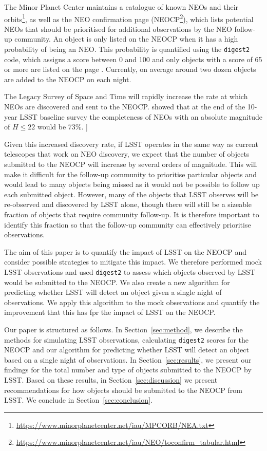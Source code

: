 \documentclass[twocolumn]{aastex631}
\newcommand{\todo}[1]{{\color{red}{[TODO: #1}]}}
\newcommand{\dig}{\texttt{digest2}}
\begin{document}
The Minor Planet Center maintains a catalogue of known NEOs and their orbits\footnote{\url{https://www.minorplanetcenter.net/iau/MPCORB/NEA.txt}}, as well as the NEO confirmation page (NEOCP\footnote{\url{https://www.minorplanetcenter.net/iau/NEO/toconfirm_tabular.html}}), which lists potential NEOs that should be prioritised for additional observations by the NEO follow-up community. An object is only listed on the NEOCP when it has a high probability of being an NEO. This probability is quantified using the \dig{} code, which assigns a score between 0 and 100 and only objects with a score of 65 or more are listed on the page \citep{Keys+2019}. Currently, on average around two dozen objects are added to the NEOCP on each night.

The Legacy Survey of Space and Time \citep[LSST][]{Ivezic+2019} will rapidly increase the rate at which NEOs are discovered and sent to the NEOCP. \citet{Jones+2018} showed that at the end of the 10-year LSST baseline survey the completeness of NEOs with an absolute magnitude of $H \le 22$ would be 73\%. \todo{probably need more details here, e.g.\ how many NEOs discovered in only a year, like in Mario's scary AAS presentations}

Given this increased discovery rate, if LSST operates in the same way as current telescopes that work on NEO discovery, we expect that the number of objects submitted to the NEOCP will increase by several orders of magnitude. This will make it difficult for the follow-up community to prioritise particular objects and would lead to many objects being missed as it would not be possible to follow up each submitted object. However, many of the objects that LSST observes will be re-observed and discovered by LSST alone, though there will still be a sizeable fraction of objects that require community follow-up. It is therefore important to identify this fraction so that the follow-up community can effectively prioritise observations.

The aim of this paper is to quantify the impact of LSST on the NEOCP and consider possible strategies to mitigate this impact. We therefore performed mock LSST observations and used \dig{} to assess which objects observed by LSST would be submitted to the NEOCP. We also create a new algorithm for predicting whether LSST will detect an object given a single night of observations. We apply this algorithm to the mock observations and quantify the improvement that this has fpr the impact of LSST on the NEOCP.

Our paper is structured as follows. In Section~\ref{sec:method}, we describe the methods for simulating LSST observations, calculating \dig{} scores for the NEOCP and our algorithm for predicting whether LSST will detect an object based on a single night of observations. In Section~\ref{sec:results}, we present our findings for the total number and type of objects submitted to the NEOCP by LSST. Based on these results, in Section~\ref{sec:discussion} we present recommendations for how objects should be submitted to the NEOCP from LSST. We conclude in Section~\ref{sec:conclusion}.
\end{document}
